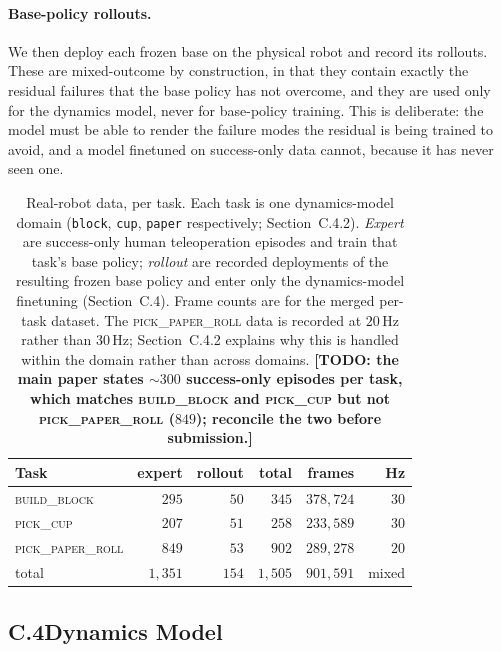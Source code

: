 \documentclass[letterpaper]{article} %
\newcommand{\todo}[1]{\textbf{[TODO: #1]}}
\begin{document}
\paragraph{Base-policy rollouts.}
We then deploy each frozen base on the physical robot and record its rollouts.
These are mixed-outcome by construction, in that they contain exactly the residual
failures that the base policy has not overcome, and they are used only for the
dynamics model, never for base-policy training. This is deliberate: the model
must be able to render the failure modes the residual is being trained to avoid,
and a model finetuned on success-only data cannot, because it has never seen one.

\begin{table}[t]
\centering\small\setlength{\tabcolsep}{4pt}
\begin{tabular}{@{}lrrrrr@{}}
\toprule
Task & expert & rollout & total & frames & Hz \\
\midrule
\textsc{build\_block}      & $295$ & $50$ & $345$ & $378{,}724$ & $30$ \\
\textsc{pick\_cup}         & $207$ & $51$ & $258$ & $233{,}589$ & $30$ \\
\textsc{pick\_paper\_roll} & $849$ & $53$ & $902$ & $289{,}278$ & $20$ \\
\midrule
total                      & $1{,}351$ & $154$ & $1{,}505$ & $901{,}591$ & mixed \\
\bottomrule
\end{tabular}
\caption{Real-robot data, per task. Each task is one dynamics-model domain
(\texttt{block}, \texttt{cup}, \texttt{paper} respectively; Section~C.4.2).
\emph{Expert} are success-only human
teleoperation episodes and train that task's base policy; \emph{rollout} are
recorded deployments of the resulting frozen base policy and enter only the
dynamics-model finetuning (Section~C.4). Frame counts are for the merged
per-task dataset. The \textsc{pick\_paper\_roll} data is recorded at $20$\,Hz
rather than $30$\,Hz; Section~C.4.2 explains why this is handled within the domain
rather than across domains. \todo{the main paper states ${\sim}300$ success-only
episodes per task, which matches \textsc{build\_block} and \textsc{pick\_cup} but
not \textsc{pick\_paper\_roll} ($849$); reconcile the two before submission.}}
\label{tab:realdata}
\end{table}

\subsection{C.4\quad Dynamics Model}
\end{document}
